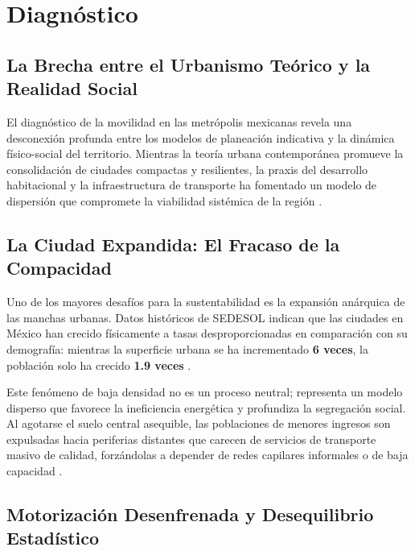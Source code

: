 \section{Diagnóstico}

\subsection{La Brecha entre el Urbanismo Teórico y la Realidad Social}

El diagnóstico de la movilidad en las metrópolis mexicanas revela una desconexión profunda 
entre los modelos de planeación indicativa y la dinámica físico-social del territorio. 
Mientras la teoría urbana contemporánea promueve la consolidación de ciudades compactas y 
resilientes, la praxis del desarrollo habitacional y la infraestructura de transporte ha 
fomentado un modelo de dispersión que compromete la viabilidad sistémica de la región 
\cite{NOM004, ConstitucionMex}.

\subsection{La Ciudad Expandida: El Fracaso de la Compacidad}

Uno de los mayores desafíos para la sustentabilidad es la expansión anárquica de las manchas 
urbanas. Datos históricos de SEDESOL indican que las ciudades en México han crecido físicamente 
a tasas desproporcionadas en comparación con su demografía: mientras la superficie urbana se 
ha incrementado \textbf{6 veces}, la población solo ha crecido \textbf{1.9 veces} 
\cite{ITDP_Espacio, IMCO2019Doc}. 

Este fenómeno de baja densidad no es un proceso neutral; representa un modelo disperso que 
favorece la ineficiencia energética y profundiza la segregación social. Al agotarse 
el suelo central asequible, las poblaciones de menores ingresos son expulsadas hacia 
periferias distantes que carecen de servicios de transporte masivo de calidad, 
forzándolas a depender de redes capilares informales o de baja capacidad 
\cite{ramirez2025analisis, RedalycPeaton}.

\subsection{Motorización Desenfrenada y Desequilibrio Estadístico}

